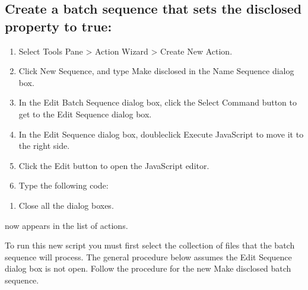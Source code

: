 \documentclass[letterpaper,12pt,english,openany,oneside]{sphinxmanual}
\begin{document}
\subsection{Create a batch sequence that sets the disclosed property to true:}
\label{\detokenize{index:create-a-batch-sequence-that-sets-the-disclosed-property-to-true}}\begin{enumerate}
%
\item {} 
Select Tools Pane > Action Wizard > Create New Action.

\item {} 
Click New Sequence, and type Make disclosed in the Name Sequence dialog box.

\item {} 
In the Edit Batch Sequence dialog box, click the Select Command button to get to the Edit Sequence dialog box.

\item {} 
In the Edit Sequence dialog box, double\sphinxhyphen{}click Execute JavaScript to move it to the right side.

\item {} 
Click the Edit button to open the JavaScript editor.

\item {} 
Type the following code:

\end{enumerate}

\begin{sphinxVerbatim}[commandchars=\\\{\}]
   
  
\end{sphinxVerbatim}
\begin{enumerate}
%
\setcounter{enumi}{6}
\item {} 
Close all the dialog boxes.

\end{enumerate}

 now appears in the list of actions.

To run this new script you must first select the collection of files that the batch sequence will process. The general procedure below assumes the Edit Sequence dialog box is not open. Follow the procedure for the new Make disclosed batch sequence.
\end{document}
